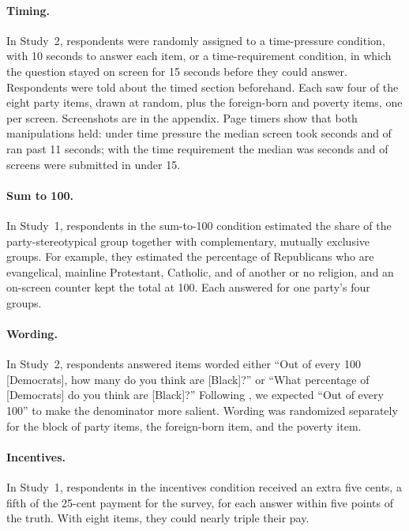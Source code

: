 \documentclass[11pt]{article}
\begin{document}
\paragraph{Timing.} In Study~2, \nTiming{} respondents were randomly assigned to a time-pressure condition, with 10 seconds to answer each item, or a time-requirement condition, in which the question stayed on screen for 15 seconds before they could answer. Respondents were told about the timed section beforehand. Each saw four of the eight party items, drawn at random, plus the foreign-born and poverty items, one per screen. Screenshots are in the appendix. Page timers show that both manipulations held: under time pressure the median screen took \fastMedian{} seconds and \fastOver{} of \fastPages{} ran past 11 seconds; with the time requirement the median was \slowMedian{} seconds and \slowUnder{} of \slowPages{} screens were submitted in under 15.

\paragraph{Sum to 100.} In Study~1, respondents in the sum-to-100 condition estimated the share of the party-stereotypical group together with complementary, mutually exclusive groups. For example, they estimated the percentage of Republicans who are evangelical, mainline Protestant, Catholic, and of another or no religion, and an on-screen counter kept the total at 100. Each answered for one party's four groups.

\paragraph{Wording.} In Study~2, \nWording{} respondents answered items worded either ``Out of every 100 [Democrats], how many do you think are [Black]?'' or ``What percentage of [Democrats] do you think are [Black]?'' Following \citet{sides2007b}, we expected ``Out of every 100'' to make the denominator more salient. Wording was randomized separately for the block of party items, the foreign-born item, and the poverty item.

\paragraph{Incentives.} In Study~1, respondents in the incentives condition received an extra five cents, a fifth of the 25-cent payment for the survey, for each answer within five points of the truth. With eight items, they could nearly triple their pay.
\end{document}
